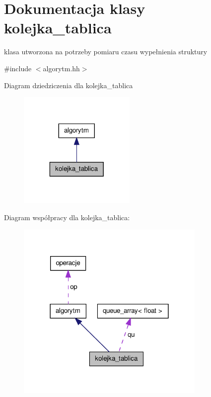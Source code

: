 \hypertarget{classkolejka__tablica}{\section{\-Dokumentacja klasy kolejka\-\_\-tablica}
\label{classkolejka__tablica}
}


klasa utworzona na potrzeby pomiaru czasu wypełnienia struktury  




{\ttfamily \#include $<$algorytm.\-hh$>$}



\-Diagram dziedziczenia dla kolejka\-\_\-tablica
\nopagebreak
\begin{figure}[H]
\begin{center}
\leavevmode
\includegraphics[width=160pt]{classkolejka__tablica__inherit__graph}
\end{center}
\end{figure}


\-Diagram współpracy dla kolejka\-\_\-tablica\-:
\nopagebreak
\begin{figure}[H]
\begin{center}
\leavevmode
\includegraphics[width=258pt]{classkolejka__tablica__coll__graph}
\end{center}
\end{figure}

